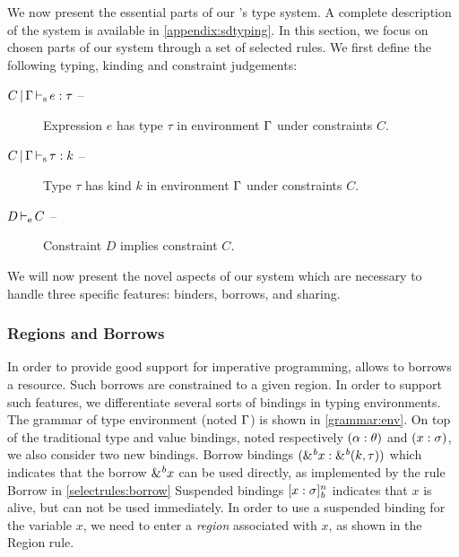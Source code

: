 We now present the essential parts of our \lang's type system. A complete
description of the system is available in \cref{appendix:sdtyping}.
In this section, we focus on chosen parts of our system
through a set of selected rules.
%
We first define the following typing, kinding and constraint judgements:
\begin{description}
\item[$C \operatorname{|} \Gamma \operatorname{\vdash_s} e : \tau$ --]
  Expression $e$ has type $\tau$ in environment $\Gamma$ under constraints $C$.
\item[$C \operatorname{|} \Gamma \operatorname{\vdash_s} \tau : k$ --]
  Type $\tau$ has kind $k$ in environment $\Gamma$ under constraints $C$.
\item[$D \operatorname{\vdash_e} C$ --] Constraint $D$ implies constraint $C$.
\end{description}

We will now present the novel aspects of our system which are necessary to handle
three specific features: binders, borrows, and sharing.


\subsubsection{Regions and Borrows}

In order to provide good support for imperative programming, \affe allows
to borrows a resource. Such borrows are constrained to a given
region.
In order to support such features, we differentiate several sorts of
bindings in typing environments.
The grammar of type environment (noted $\Gamma$) is shown in \cref{grammar:env}.
On top of the traditional type and value bindings, noted respectively
$(\alpha : \theta)$ and $(x : \sigma)$, we also consider two new
bindings.
Borrow bindings $({\&}^{\textit{b}}x : {\&}^{\textit{b}}(k,\tau))$ which indicates
that the borrow ${\&}^{\textit{b}}x$ can be used directly, as implemented
by the rule {\sc Borrow} in \cref{selectrules:borrow}
Suspended bindings $[x : \sigma]_{\textit{b}}^n$ indicates that $x$ is alive, but
can not be used immediately.
In order to use a suspended binding for the variable $x$,
we need to enter a \emph{region} associated with $x$,
as shown in the {\sc Region} rule.


